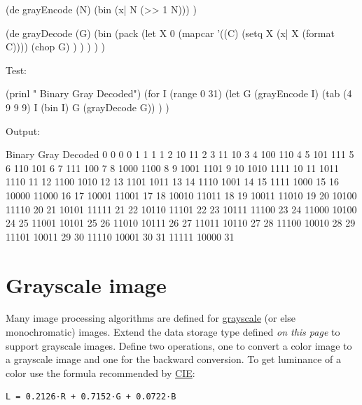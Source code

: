 \begin{wideverbatim}

(de grayEncode (N)
   (bin (x| N (>> 1 N))) )

(de grayDecode (G)
   (bin
      (pack
         (let X 0
            (mapcar
               '((C) (setq X (x| X (format C))))
               (chop G) ) ) ) ) )

Test:

(prinl "       Binary     Gray  Decoded")
(for I (range 0 31)
   (let G (grayEncode I)
      (tab (4 9 9 9) I (bin I) G (grayDecode G)) ) )

Output:

       Binary     Gray  Decoded
   0        0        0        0
   1        1        1        1
   2       10       11        2
   3       11       10        3
   4      100      110        4
   5      101      111        5
   6      110      101        6
   7      111      100        7
   8     1000     1100        8
   9     1001     1101        9
  10     1010     1111       10
  11     1011     1110       11
  12     1100     1010       12
  13     1101     1011       13
  14     1110     1001       14
  15     1111     1000       15
  16    10000    11000       16
  17    10001    11001       17
  18    10010    11011       18
  19    10011    11010       19
  20    10100    11110       20
  21    10101    11111       21
  22    10110    11101       22
  23    10111    11100       23
  24    11000    10100       24
  25    11001    10101       25
  26    11010    10111       26
  27    11011    10110       27
  28    11100    10010       28
  29    11101    10011       29
  30    11110    10001       30
  31    11111    10000       31

\end{wideverbatim}

\pagebreak{}
\section*{Grayscale image}

Many image processing algorithms are defined for
\href{http://en.wikipedia.org/wiki/Grayscale}{grayscale} (or else
monochromatic) images. Extend the data storage type defined \emph{on
  this page} to support grayscale images. Define two operations, one
to convert a color image to a grayscale image and one for the backward
conversion. To get luminance of a color use the formula recommended by
\href{http://www.cie.co.at/index\_ie.html}{CIE}:

\begin{verbatim}
L = 0.2126·R + 0.7152·G + 0.0722·B
\end{verbatim}

